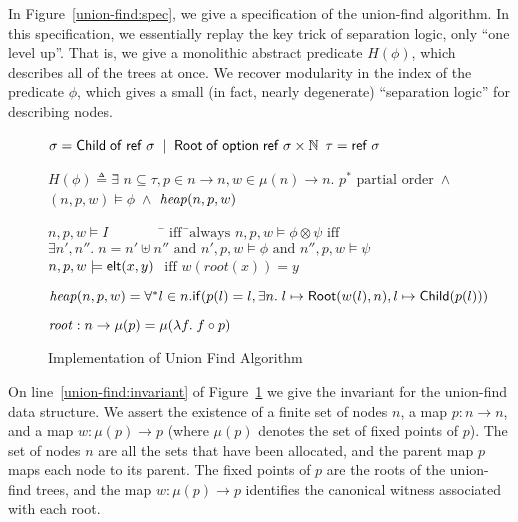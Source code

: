 In Figure~\ref{union-find:spec}, we give a specification of the
union-find algorithm. In this specification, we essentially replay the
key trick of separation logic, only ``one level up''. That is, we give
a monolithic abstract predicate $H(\phi)$, which describes all of the
trees at once. We recover modularity in the index of the predicate
$\phi$, which gives a small (in fact, nearly degenerate) ``separation
logic'' for describing nodes. 

\begin{figure}
\mbox{}
\begin{specification}
\nextline $\sigma = \mathsf{Child} \;\mathsf{of}\; \mathsf{ref}\;\sigma \;\;|\;\; \mathsf{Root} \;\mathsf{of}\; \mathsf{option }{\;}{\mathsf{ref}\;\sigma} \times \mathbb{N}$ 
\nextline $\tau = \mathsf{ref}\;\sigma$ 

   $H(\phi) \triangleq \exists$\=
     $n \subseteq \tau, p \in n \to n, w \in \mu(n) \to n.$
\nextline \> $p^{*} \mbox{ partial order} \;\land$ 
\nextline \> $(n, p, w) \models \phi \;\land$
\nextline \> $\mathit{heap}(n, p, w)$ 

\nextline[1em] $n, p, w \models I \qquad\qquad$\=$\mbox{ iff}\;\;$\=$\mbox{always}$ 
\nextline      $n, p, w \models \phi \otimes \psi$\>$\mbox{ iff}$\>$
                     \exists n', n''.\; n = n' \uplus n'' \mbox{ and } n', p, w \models \phi \mbox{ and } 
                     n'', p, w \models \psi$
\nextline      $n, p, w \models \mathsf{elt}({x}, {y})$ \> $\mbox{ iff }$\>$
                 w(\mathit{root}(x)) = y$

\nextline[1em] $\mathit{heap}(n, p, w) =  \forall^{*} l \in n. \mathsf{if}({p(l) = l}, {\exists n.\; l \mapsto \mathsf{Root}(w(l), n)}, {l \mapsto \mathsf{Child}(p(l))})$

\nextline[1em] $\mathit{root} : n \to \mu(p) = \mu(\lambda f.\;f \circ p)$
\end{specification}
\caption{Implementation of Union Find Algorithm}
\label{union-find:impl}
\end{figure}
 
On line~\ref{union-find:invariant} of Figure~\ref{union-find:impl} we
give the invariant for the union-find data structure. We assert the
existence of a finite set of nodes $n$, a map $p : n \to n$, and a map
$w : \mu(p) \to p$ (where $\mu(p)$ denotes the set of fixed points of
$p$). The set of nodes $n$ are all the sets that have been allocated,
and the parent map $p$ maps each node to its parent. The fixed points
of $p$ are the roots of the union-find trees, and the map $w : \mu(p)
\to p$ identifies the canonical witness associated with each root.

